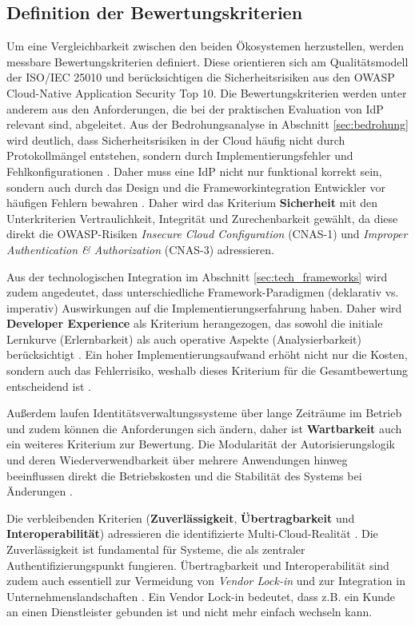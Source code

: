 \subsection{Definition der Bewertungskriterien}
\label{sec:bewertungskriterien}

Um eine Vergleichbarkeit zwischen den beiden Ökosystemen herzustellen, werden messbare Bewertungskriterien definiert. Diese orientieren sich am Qualitätsmodell der ISO/IEC 25010 und berücksichtigen die Sicherheitsrisiken aus den \ac{OWASP} Cloud-Native Application Security Top 10.
\newline
Die Bewertungskriterien werden unter anderem aus den Anforderungen, die bei der praktischen Evaluation von \ac{IdP} relevant sind, abgeleitet. Aus der Bedrohungsanalyse in Abschnitt \ref{sec:bedrohung} wird deutlich, dass Sicherheitsrisiken in der Cloud häufig nicht durch Protokollmängel entstehen, sondern durch Implementierungsfehler und Fehlkonfigurationen \citep{Dietrich2018}. Daher muss eine \ac{IdP} nicht nur funktional korrekt sein, sondern auch durch das Design und die Frameworkintegration Entwickler vor häufigen Fehlern bewahren \citep{Green2016}. Daher wird das Kriterium \textbf{Sicherheit} mit den Unterkriterien Vertraulichkeit, Integrität und Zurechenbarkeit gewählt, da diese direkt die OWASP-Risiken \textit{Insecure Cloud Configuration} (CNAS-1) und \textit{Improper Authentication \& Authorization} (CNAS-3) adressieren.

Aus der technologischen Integration im Abschnitt \ref{sec:tech_frameworks} wird zudem angedeutet, dass unterschiedliche Framework-Paradigmen (deklarativ vs. imperativ) Auswirkungen auf die Implementierungserfahrung haben. Daher wird \textbf{Developer Experience} als Kriterium herangezogen, das sowohl die initiale Lernkurve (Erlernbarkeit) als auch operative Aspekte (Analysierbarkeit) berücksichtigt \citep{Myers2016}. Ein hoher Implementierungsaufwand erhöht nicht nur die Kosten, sondern auch das Fehlerrisiko, weshalb dieses Kriterium für die Gesamtbewertung entscheidend ist \citep{Green2016}.

Außerdem laufen Identitätsverwaltungssysteme über lange Zeiträume im Betrieb und zudem können die Anforderungen sich ändern, daher ist \textbf{Wartbarkeit} auch ein weiteres Kriterium zur Bewertung. Die Modularität der Autorisierungslogik und deren Wiederverwendbarkeit über mehrere Anwendungen hinweg beeinflussen direkt die Betriebskosten und die Stabilität des Systems bei Änderungen \citep{Myers2016}.

Die verbleibenden Kriterien (\textbf{Zuverlässigkeit}, \textbf{Übertragbarkeit} und \textbf{Interoperabilität}) adressieren die identifizierte Multi-Cloud-Realität \citep{Ali2025}. Die Zuverlässigkeit ist fundamental für Systeme, die als zentraler Authentifizierungspunkt fungieren. Übertragbarkeit und Interoperabilität sind zudem auch essentiell zur Vermeidung von \textit{Vendor Lock-in} und zur Integration in Unternehmenslandschaften \citep{Zhuravel2024}. Ein Vendor Lock-in bedeutet, dass z.B. ein Kunde an einen Dienstleister gebunden ist und nicht mehr einfach wechseln kann.


